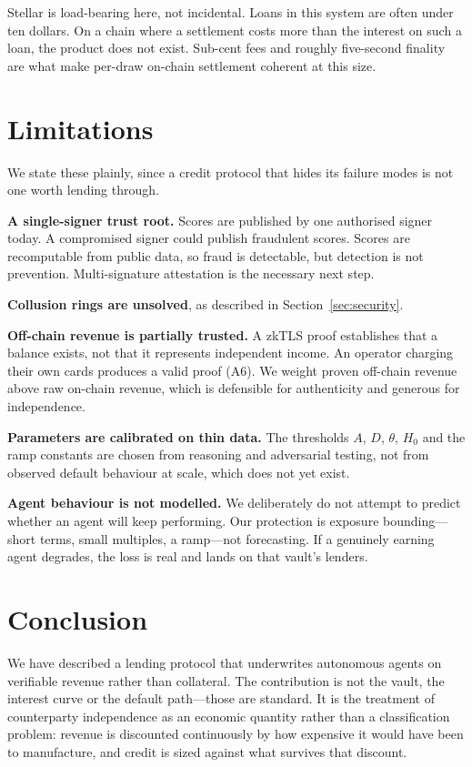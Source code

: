 \documentclass[11pt,a4paper]{article}
\begin{document}
Stellar is load-bearing here, not incidental. Loans in this system are often
under ten dollars. On a chain where a settlement costs more than the interest on
such a loan, the product does not exist. Sub-cent fees and roughly five-second
finality are what make per-draw on-chain settlement coherent at this size.

\section{Limitations}
\label{sec:limits}

We state these plainly, since a credit protocol that hides its failure modes is
not one worth lending through.

\textbf{A single-signer trust root.} Scores are published by one authorised
signer today. A compromised signer could publish fraudulent scores. Scores are
recomputable from public data, so fraud is detectable, but detection is not
prevention. Multi-signature attestation is the necessary next step.

\textbf{Collusion rings are unsolved}, as described in
Section~\ref{sec:security}.

\textbf{Off-chain revenue is partially trusted.} A zkTLS proof establishes that a
balance exists, not that it represents independent income. An operator charging
their own cards produces a valid proof (A6). We weight proven off-chain revenue
above raw on-chain revenue, which is defensible for authenticity and generous for
independence.

\textbf{Parameters are calibrated on thin data.} The thresholds $A$, $D$,
$\theta$, $H_0$ and the ramp constants are chosen from reasoning and adversarial
testing, not from observed default behaviour at scale, which does not yet exist.

\textbf{Agent behaviour is not modelled.} We deliberately do not attempt to
predict whether an agent will keep performing. Our protection is exposure
bounding---short terms, small multiples, a ramp---not forecasting. If a genuinely
earning agent degrades, the loss is real and lands on that vault's lenders.

\section{Conclusion}

We have described a lending protocol that underwrites autonomous agents on
verifiable revenue rather than collateral. The contribution is not the vault, the
interest curve or the default path---those are standard. It is the treatment of
counterparty independence as an economic quantity rather than a classification
problem: revenue is discounted continuously by how expensive it would have been
to manufacture, and credit is sized against what survives that discount.
\end{document}
